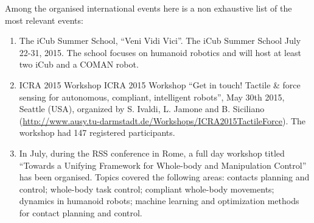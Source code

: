 Among the organised international events here is a non exhaustive list of the most relevant events:

\begin{enumerate}

\item The iCub Summer School, ``Veni Vidi Vici''. The iCub Summer School July 22-31, 2015. The school focuses on humanoid robotics and will host at least two iCub and a COMAN robot. 

\item ICRA 2015 Workshop ICRA 2015 Workshop ``Get in touch! Tactile \& force sensing for autonomous, compliant, intelligent robots'', May 30th 2015, Seattle (USA), organized by S. Ivaldi, L. Jamone and B. Siciliano (\url{http://www.ausy.tu-darmstadt.de/Workshops/ICRA2015TactileForce}). The workshop had 147 registered participants.

\item In July, during the RSS conference in Rome, a full day workshop titled ``Towards a Unifying Framework for Whole-body and Manipulation Control'' has been organised. Topics covered the following areas: contacts planning and control; whole-body task control; compliant whole-body movements; dynamics in humanoid robots; machine learning and optimization methods for contact planning and control.
\end{enumerate} 


